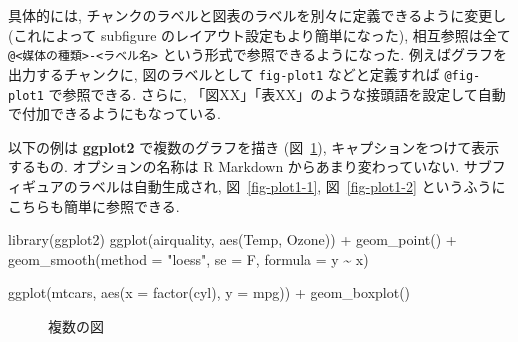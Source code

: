 \documentclass[
  letterpaper,
  DIV=11,
  pandoc,
  ja=standard,
  jafont=noto-otf]{bxjsarticle}
\newenvironment{Shaded}{\begin{snugshade}}{\end{snugshade}}
\newcommand{\AttributeTok}[1]{\textcolor[rgb]{0.00,0.48,0.65}{#1}}
\newcommand{\FunctionTok}[1]{\textcolor[rgb]{0.28,0.35,0.67}{#1}}
\newcommand{\NormalTok}[1]{\textcolor[rgb]{0.00,0.48,0.65}{#1}}
\newcommand{\SpecialCharTok}[1]{\textcolor[rgb]{0.37,0.37,0.37}{#1}}
\newcommand{\StringTok}[1]{\textcolor[rgb]{0.13,0.47,0.30}{#1}}
\begin{document}
具体的には, チャンクのラベルと図表のラベルを別々に定義できるように変更し
(これによって subfigure のレイアウト設定もより簡単になった),
相互参照は全て
\texttt{@\textless{}媒体の種類\textgreater{}-\textless{}ラベル名\textgreater{}}
という形式で参照できるようになった. 例えばグラフを出力するチャンクに,
図のラベルとして \texttt{fig-plot1} などと定義すれば \texttt{@fig-plot1}
で参照できる. さらに,
「図XX」「表XX」のような接頭語を設定して自動で付加できるようにもなっている.

以下の例は \textbf{ggplot2} で複数のグラフを描き (図~\ref{fig-plot1}),
キャプションをつけて表示するもの. オプションの名称は R Markdown
からあまり変わっていない. サブフィギュアのラベルは自動生成され,
図~\ref{fig-plot1-1}, 図~\ref{fig-plot1-2}
というふうにこちらも簡単に参照できる.

\begin{Shaded}
\begin{Highlighting}[]
\FunctionTok{library}\NormalTok{(ggplot2)}
\FunctionTok{ggplot}\NormalTok{(airquality, }\FunctionTok{aes}\NormalTok{(Temp, Ozone)) }\SpecialCharTok{+} 
        \FunctionTok{geom\_point}\NormalTok{() }\SpecialCharTok{+} 
        \FunctionTok{geom\_smooth}\NormalTok{(}\AttributeTok{method =} \StringTok{"loess"}\NormalTok{, }\AttributeTok{se =}\NormalTok{ F, }\AttributeTok{formula =}\NormalTok{ y }\SpecialCharTok{\textasciitilde{}}\NormalTok{ x)}

\FunctionTok{ggplot}\NormalTok{(mtcars, }\FunctionTok{aes}\NormalTok{(}\AttributeTok{x =} \FunctionTok{factor}\NormalTok{(cyl), }\AttributeTok{y =}\NormalTok{ mpg)) }\SpecialCharTok{+} \FunctionTok{geom\_boxplot}\NormalTok{()}
\end{Highlighting}
\end{Shaded}

\begin{figure}

%

\caption{\label{fig-plot1}複数の図}

\end{figure}
\end{document}
